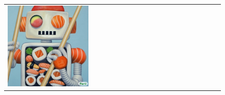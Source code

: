 \begin{figure}[ht!]
\begin{adjustwidth}{-0.8in}{-0.5in}
\begin{tabular}{cccccccccccccccccccc}
\multicolumn{2}{c}{\includegraphics[width=\threebythreecolwidth\textwidth]{figures/cherries/sushi_robot_2.jpg}} \\



\end{tabular}
\end{adjustwidth}
\end{figure}
